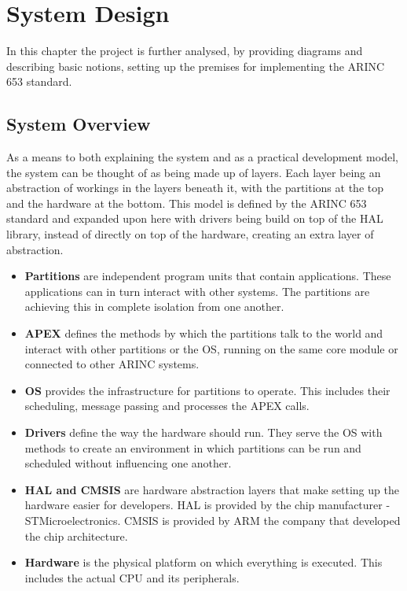 \chapter{System Design}

In this chapter the project is further analysed, by providing diagrams 
and describing basic notions, setting up the premises for implementing
the ARINC 653 standard.

\section{System Overview}
As a means to both explaining the system and as a practical development
model, the system can be thought of as being made up of layers.
Each layer being an abstraction of workings in the layers beneath it,
with the partitions at the top and the hardware at the bottom.
This model is defined by the ARINC 653 standard
and expanded upon here with drivers being build on top of the HAL library,
instead of directly on top of the hardware,
creating an extra layer of abstraction.

\begin{itemize}
	\item \textbf{Partitions}
		are independent program units that contain applications. These
		applications can in turn interact with other systems. The
		partitions are achieving this  in complete isolation from 
		one another.
	\item \textbf{APEX}
		defines the methods by which the partitions talk to the world and
		interact with other partitions or the OS, running
		on the same core module or connected to other ARINC systems.
	\item \textbf{OS}
		provides the infrastructure for partitions to operate. This 
		includes their scheduling, message passing and processes 
		the APEX calls.
	\item \textbf{Drivers}
		define the way the hardware should run.	
		They serve the OS with methods to create an environment in which
		partitions can be run and scheduled without influencing one
		another.
	\item \textbf{HAL and CMSIS}
		are hardware abstraction layers that make setting up the hardware
		easier for developers. HAL is provided by the chip manufacturer - 
		STMicroelectronics. CMSIS is provided by ARM the company that
		developed the chip architecture.
	\item \textbf{Hardware}
		is the physical platform on which everything is executed. This 
		includes the actual CPU and its peripherals.
\end{itemize}

